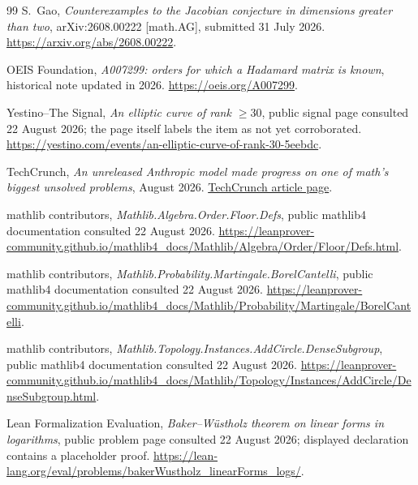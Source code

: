 \documentclass[11pt]{article}
\theoremstyle{definition}
\theoremstyle{remark}
\begin{document}
\begin{thebibliography}{99}
S.~Gao,
\newblock \emph{Counterexamples to the Jacobian conjecture in dimensions greater
than two},
\newblock arXiv:2608.00222 [math.AG], submitted 31 July 2026.
\newblock \url{https://arxiv.org/abs/2608.00222}.

OEIS Foundation,
\newblock \emph{A007299: orders for which a Hadamard matrix is known},
historical note updated in 2026.
\newblock \url{https://oeis.org/A007299}.

Yestino--The Signal,
\newblock \emph{An elliptic curve of rank $\ge30$},
public signal page consulted 22 August 2026; the page itself labels the item as not
yet corroborated.
\newblock \url{https://yestino.com/events/an-elliptic-curve-of-rank-30-5eebdc}.

TechCrunch,
\newblock \emph{An unreleased Anthropic model made progress on one of math's biggest
unsolved problems},
 August 2026.
\newblock
\href{https://techcrunch.com/2026/08/11/an-unreleased-anthropic-model-made-progress-on-one-of-maths-biggest-unsolved-problems/}{TechCrunch article page}.

mathlib contributors,
\newblock \emph{Mathlib.Algebra.Order.Floor.Defs},
public mathlib4 documentation consulted 22 August 2026.
\newblock
\url{https://leanprover-community.github.io/mathlib4_docs/Mathlib/Algebra/Order/Floor/Defs.html}.

mathlib contributors,
\newblock \emph{Mathlib.Probability.Martingale.BorelCantelli},
public mathlib4 documentation consulted 22 August 2026.
\newblock
\url{https://leanprover-community.github.io/mathlib4_docs/Mathlib/Probability/Martingale/BorelCantelli}.

mathlib contributors,
\newblock \emph{Mathlib.Topology.Instances.AddCircle.DenseSubgroup},
public mathlib4 documentation consulted 22 August 2026.
\newblock
\url{https://leanprover-community.github.io/mathlib4_docs/Mathlib/Topology/Instances/AddCircle/DenseSubgroup.html}.

Lean Formalization Evaluation,
\newblock \emph{Baker--W\"ustholz theorem on linear forms in logarithms},
public problem page consulted 22 August 2026; displayed declaration contains a
placeholder proof.
\newblock
\url{https://lean-lang.org/eval/problems/bakerWustholz_linearForms_logs/}.

\end{thebibliography}
\end{document}
